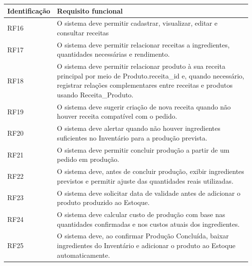 \begin{quadro}
    \centering
    \label{quadro:rf_producao}

    \begin{tabular}{|p{3cm}|p{11cm}|}
        \hline
        \textbf{Identificação} & \textbf{Requisito funcional} \\ \hline

        RF16 & O sistema deve permitir cadastrar, visualizar, editar e consultar receitas \\ \hline

        RF17 & O sistema deve permitir relacionar receitas a ingredientes, quantidades necessárias e rendimento. \\ \hline

        RF18 & O sistema deve permitir relacionar produto à sua receita principal por meio de Produto.receita\_id e, quando necessário, registrar relações complementares entre receitas e produtos usando Receita\_Produto. \\ \hline

        RF19 & O sistema deve sugerir criação de nova receita quando não houver receita compatível com o pedido. \\ \hline

        RF20 & O sistema deve alertar quando não houver ingredientes suficientes no Inventário para a produção prevista. \\ \hline

        RF21 & O sistema deve permitir concluir produção a partir de um pedido em produção. \\ \hline

        RF22 & O sistema deve, antes de concluir produção, exibir ingredientes previstos e permitir ajuste das quantidades reais utilizadas. \\ \hline

        RF23 & O sistema deve solicitar data de validade antes de adicionar o produto produzido ao Estoque. \\ \hline

        RF24 & O sistema deve calcular custo de produção com base nas quantidades confirmadas e nos custos atuais dos ingredientes. \\ \hline

        RF25 &  O sistema deve, ao confirmar Produção Concluída, baixar ingredientes do Inventário e adicionar o produto ao Estoque automaticamente. \\ \hline


\end{tabular}
\end{quadro}
